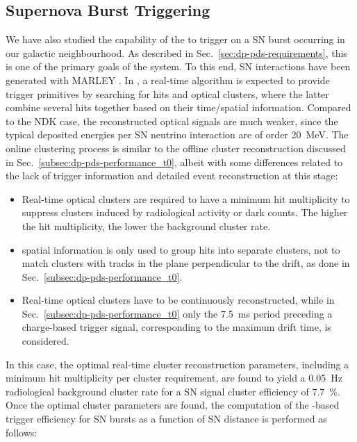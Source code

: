 

\subsection{Supernova Burst Triggering}
\label{subsec:dp-pds-performance_trigger}

We have also studied the capability of the   to trigger on a SN burst occurring in our galactic neighbourhood. As described in Sec.~\ref{sec:dp-pds-requirements}, this is one of the primary goals of the system. To this end, SN \nue {} interactions have been generated with MARLEY \cite{marley}. In , a real-time algorithm is expected to provide trigger primitives by searching for  hits and optical clusters, where the latter combine several hits together based on their time/spatial information. Compared to the NDK case, the reconstructed optical signals are much weaker, since the typical deposited energies per SN neutrino interaction are of order \SI{20}{\MeV}. The online clustering process is similar to the offline cluster reconstruction discussed in Sec.~\ref{subsec:dp-pds-performance_t0}, albeit with some differences related to the lack of trigger information and detailed event reconstruction at this stage:
%
\begin{itemize}
\item Real-time optical clusters are required to have a minimum hit multiplicity to suppress clusters induced by radiological activity or  dark counts. The higher the hit multiplicity, the lower the background cluster rate.
\item {} spatial information is only used to group hits into separate clusters,  not to match  clusters with  tracks in the plane perpendicular to the drift, as done in Sec.~\ref{subsec:dp-pds-performance_t0}.
\item Real-time optical clusters have to be continuously reconstructed, while in Sec.~\ref{subsec:dp-pds-performance_t0} only the \SI{7.5}{\milli\s} period preceding a charge-based trigger signal, corresponding to the maximum drift time, is considered.
\end{itemize}
%
In this case, the optimal real-time cluster reconstruction parameters, including a minimum hit multiplicity per cluster requirement, are found to yield a \SI{0.05}{\Hz} radiological background cluster rate for a SN \nue {} signal cluster efficiency of \SI{7.7}{\%}. Once the optimal cluster parameters are found, the computation of the -based trigger efficiency for SN bursts as a function of SN distance is performed as follows:

